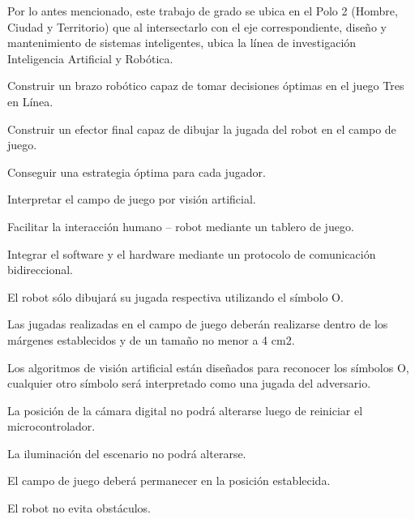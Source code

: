  Por lo antes mencionado, este trabajo de grado se ubica en el Polo 2 (Hombre, 
Ciudad y Territorio) que al intersectarlo con el eje correspondiente, diseño y 
mantenimiento de sistemas inteligentes, ubica la línea de investigación Inteligencia 
Artificial y Robótica. 

	\begin{enumeracion}
		\item Construir un brazo robótico capaz de tomar decisiones óptimas en el juego Tres 
		en Línea. 
		\item Construir un efector final capaz de dibujar la jugada del robot en el campo de 
		juego. 
		\item Conseguir una estrategia óptima para cada jugador.
		\item Interpretar el campo de juego por visión artificial.
		\item Facilitar la interacción humano – robot mediante un tablero de juego.
		\item Integrar el software y el hardware mediante un protocolo de comunicación 
		bidireccional. 
	\end{enumeracion}
	
		\begin{enumeracion}
			\item El robot sólo dibujará su jugada respectiva utilizando el símbolo O. 
			\item Las jugadas realizadas en el campo de juego deberán realizarse dentro de los 
			márgenes establecidos y de un tamaño no menor a 4 cm2.  
			\item Los algoritmos de visión artificial están diseñados para reconocer los símbolos O, 
			cualquier otro símbolo será interpretado como una jugada del adversario. 
			\item  La posición de la cámara digital no podrá alterarse luego de reiniciar el 
			microcontrolador. 
			\item La iluminación del escenario no podrá alterarse. 
			\item El campo de juego deberá permanecer en la posición establecida. 
			\item El robot no evita obstáculos. 
		\end{enumeracion}
	